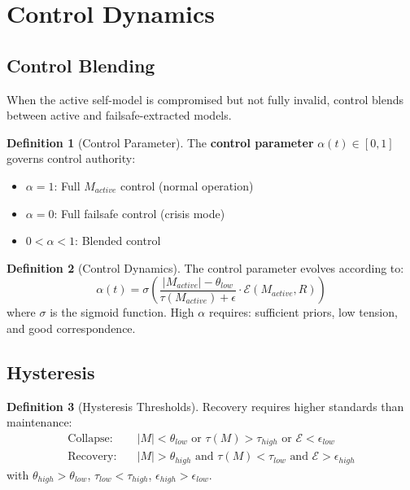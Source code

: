 \documentclass[12pt,a4paper]{article}
\theoremstyle{definition}
\newtheorem{definition}{Definition}[section]
\begin{document}
\section{Control Dynamics}

\subsection{Control Blending}

When the active self-model is compromised but not fully invalid, control blends between active and failsafe-extracted models.

\begin{definition}[Control Parameter]
The \textbf{control parameter} $\alpha(t) \in [0, 1]$ governs control authority:
\begin{itemize}
    \item $\alpha = 1$: Full $M_{active}$ control (normal operation)
    \item $\alpha = 0$: Full failsafe control (crisis mode)
    \item $0 < \alpha < 1$: Blended control
\end{itemize}
\end{definition}

\begin{definition}[Control Dynamics]
The control parameter evolves according to:
\[ \alpha(t) = \sigma\left( \frac{|M_{active}| - \theta_{low}}{\tau(M_{active}) + \epsilon} \cdot \mathcal{E}(M_{active}, R) \right) \]
where $\sigma$ is the sigmoid function. High $\alpha$ requires: sufficient priors, low tension, and good correspondence.
\end{definition}

\subsection{Hysteresis}

\begin{definition}[Hysteresis Thresholds]
Recovery requires higher standards than maintenance:
\begin{align}
\text{Collapse:} \quad & |M| < \theta_{low} \text{ or } \tau(M) > \tau_{high} \text{ or } \mathcal{E} < \epsilon_{low} \\
\text{Recovery:} \quad & |M| > \theta_{high} \text{ and } \tau(M) < \tau_{low} \text{ and } \mathcal{E} > \epsilon_{high}
\end{align}
with $\theta_{high} > \theta_{low}$, $\tau_{low} < \tau_{high}$, $\epsilon_{high} > \epsilon_{low}$.
\end{definition}
\end{document}
